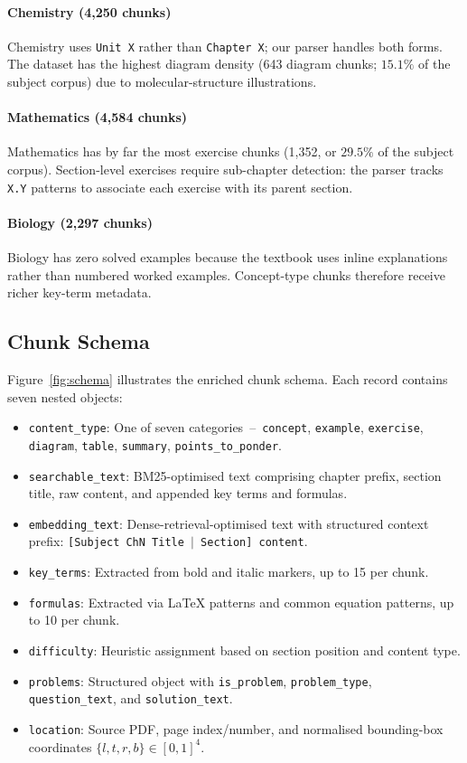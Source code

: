\documentclass[conference]{IEEEtran}
\begin{document}
\paragraph{Chemistry (4{,}250 chunks)} Chemistry uses \texttt{Unit X} rather than \texttt{Chapter X}; our parser handles both forms. The dataset has the highest diagram density (643 diagram chunks; $15.1\%$ of the subject corpus) due to molecular-structure illustrations.

\paragraph{Mathematics (4{,}584 chunks)} Mathematics has by far the most exercise chunks (1{,}352, or $29.5\%$ of the subject corpus). Section-level exercises require sub-chapter detection: the parser tracks \texttt{X.Y} patterns to associate each exercise with its parent section.

\paragraph{Biology (2{,}297 chunks)} Biology has zero solved examples because the textbook uses inline explanations rather than numbered worked examples. Concept-type chunks therefore receive richer key-term metadata.

\subsection{Chunk Schema}\label{sec:schema}
Figure~\ref{fig:schema} illustrates the enriched chunk schema. Each record contains seven nested objects:
\begin{itemize}
    \item \texttt{content\_type}: One of seven categories~--~\texttt{concept}, \texttt{example}, \texttt{exercise}, \texttt{diagram}, \texttt{table}, \texttt{summary}, \texttt{points\_to\_ponder}.
    \item \texttt{searchable\_text}: BM25-optimised text comprising chapter prefix, section title, raw content, and appended key terms and formulas.
    \item \texttt{embedding\_text}: Dense-retrieval-optimised text with structured context prefix: \texttt{[Subject ChN Title $|$ Section] content}.
    \item \texttt{key\_terms}: Extracted from bold and italic markers, up to 15 per chunk.
    \item \texttt{formulas}: Extracted via LaTeX patterns and common equation patterns, up to 10 per chunk.
    \item \texttt{difficulty}: Heuristic assignment based on section position and content type.
    \item \texttt{problems}: Structured object with \texttt{is\_problem}, \texttt{problem\_type}, \texttt{question\_text}, and \texttt{solution\_text}.
    \item \texttt{location}: Source PDF, page index/number, and normalised bounding-box coordinates $\{l, t, r, b\} \in [0, 1]^4$.
\end{itemize}
\end{document}
